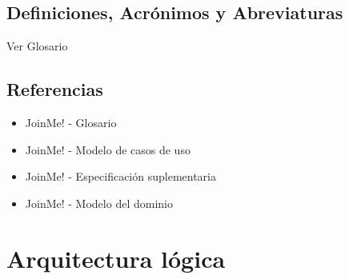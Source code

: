 \documentclass[12pt, a4paper, titlepage]{article}
\begin{document}
\subsection{Definiciones, Acrónimos y Abreviaturas}

Ver Glosario

\subsection{Referencias}

\begin{itemize}

    \item JoinMe! - Glosario
    \item JoinMe! - Modelo de casos de uso
    \item JoinMe! - Especificación suplementaria
    \item JoinMe! - Modelo del dominio
\end{itemize}

\pagebreak



\section{Arquitectura lógica}
\end{document}
